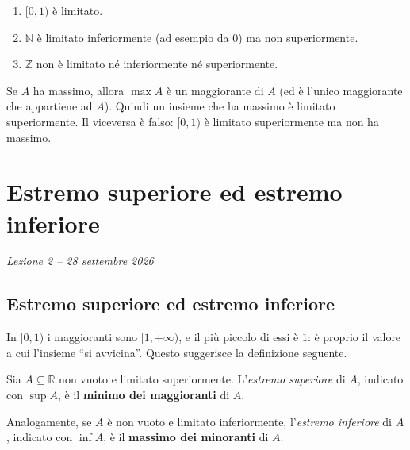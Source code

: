 \documentclass[11pt,a4paper]{article}
\begin{document}
\begin{esempio}
\leavevmode
\begin{enumerate}
    \item $[0, 1)$ è limitato.
    \item $\mathbb{N}$ è limitato inferiormente (ad esempio da $0$) ma non
          superiormente.
    \item $\mathbb{Z}$ non è limitato né inferiormente né superiormente.
\end{enumerate}
\end{esempio}

Se $A$ ha massimo, allora $\max A$ è un maggiorante di $A$ (ed è l'unico
maggiorante che appartiene ad $A$). Quindi un insieme che ha massimo è
limitato superiormente. Il viceversa è falso: $[0, 1)$ è limitato
superiormente ma non ha massimo.

\section[Estremo superiore ed estremo inferiore (Lezione 2 -- 28 settembre 2026)]{Estremo superiore ed estremo inferiore}
\noindent\emph{Lezione 2 -- 28 settembre 2026}
\subsection{Estremo superiore ed estremo inferiore}

In $[0, 1)$ i maggioranti sono $[1, +\infty)$, e il più piccolo di essi è
$1$: è proprio il valore a cui l'insieme ``si avvicina''. Questo suggerisce
la definizione seguente.

\begin{definizione}
Sia $A \subseteq \mathbb{R}$ non vuoto e limitato superiormente.
L'\emph{estremo superiore} di $A$, indicato con $\sup A$, è il
\textbf{minimo dei maggioranti} di $A$.

Analogamente, se $A$ è non vuoto e limitato inferiormente, l'\emph{estremo
inferiore} di $A$, indicato con $\inf A$, è il \textbf{massimo dei
minoranti} di $A$.
\end{definizione}

\begin{center}
\end{center}
\end{document}
